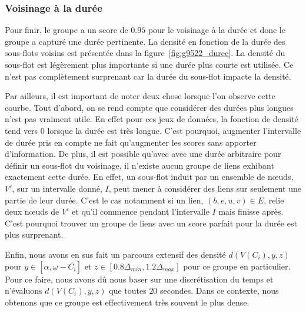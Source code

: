 \subsubsection*{Voisinage à la durée}
Pour finir, le groupe a un score de $0.95$ pour le voisinage à la durée et donc le groupe a capturé une durée  pertinente.
La densité en fonction de la durée des sous-flots voisins est présentée dans la figure~\ref{fig:g9522_duree}.
La densité du sous-flot est légèrement plus importante si une durée plus courte est utilisée.
Ce n'est pas complètement surprenant car la durée du sous-flot impacte la densité.

Par ailleurs, il est important de noter deux chose lorsque l'on observe cette courbe.
Tout d'abord, on se rend compte que considérer des durées plus longues n'est pas vraiment utile.
En effet pour ces jeux de données, la fonction de densité tend vers $0$ lorsque la durée est très longue.
C'est pourquoi, augmenter l'intervalle de durée pris en compte ne fait qu'augmenter les scores sans apporter d'information.
De plus, il est possible qu'avec avec une durée arbitraire pour définir un sous-flot du voisinage, il n'existe aucun groupe de liens exhibant exactement cette durée.
En effet, un sous-flot induit par un ensemble de n\oe uds, $V'$, sur un intervalle donné, $I$, peut mener à considérer des liens sur seulement une partie de leur durée.
C'est le cas notamment si un lien, $(b,e,u,v) \in E$, relie deux n\oe uds de $V'$ et qu'il commence pendant l'intervalle $I$ mais finisse après.
C'est pourquoi trouver un groupe de liens avec un score parfait pour la durée est plus surprenant.

\bigskip

Enfin, nous avons en sus fait un parcours extensif des densité $d(V(C_i),y,z)$ pour $y \in [\alpha, \omega - \bar{C_i}]$ et $z \in [0.8\Delta_{min}, 1.2\Delta_{max}]$ pour ce groupe en particulier.
Pour ce faire, nous avons dû nous baser sur une discrétisation du temps et n'évaluons $d(V(C_i),y,z)$ que toutes $20$ secondes.
Dans ce contexte, nous obtenons que ce groupe est effectivement très souvent le plus dense.

